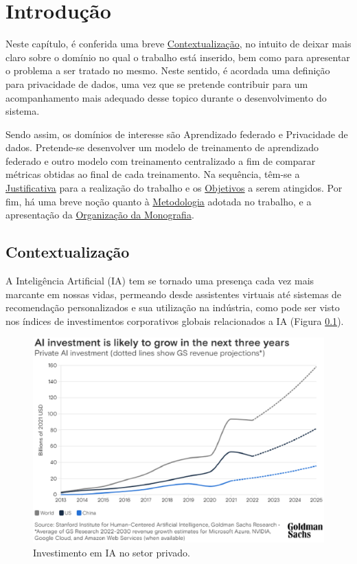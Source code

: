 \chapter*[Introdução]{Introdução}

Neste capítulo, é conferida uma breve \hyperref[sec:contextualizacao]{Contextualização}, no intuito de deixar mais claro sobre o domínio no qual o trabalho está inserido, bem como para apresentar o problema a ser tratado no mesmo. Neste sentido, é acordada uma definição para privacidade de dados, uma vez que se pretende contribuir para um acompanhamento mais adequado desse topico durante o desenvolvimento do sistema. 

Sendo assim, os domínios de interesse são Aprendizado federado e Privacidade de dados. Pretende-se desenvolver um modelo de treinamento de aprendizado federado e outro modelo com treinamento centralizado a fim de comparar métricas obtidas ao final de cada treinamento. Na sequência, têm-se a \hyperref[sec:justificativa]{Justificativa} para a realização do trabalho e os \hyperref[sec:objetivos]{Objetivos} a serem atingidos. Por fim, há uma breve noção quanto à \hyperref[sec:metodologia]{Metodologia} adotada no trabalho, e a apresentação da \hyperref[sec:organizacao]{Organização da Monografia}.

\section{Contextualização}
\label{sec:contextualizacao}

A Inteligência Artificial (IA) tem se tornado uma presença cada vez mais marcante em nossas vidas, permeando desde assistentes virtuais até sistemas de recomendação personalizados e sua utilização na indústria, como pode ser visto nos índices de investimentos corporativos globais relacionados a IA (Figura \ref{fig:investimentoIA}).

\begin{figure}[h]
    \centering
    \includegraphics[scale=0.6]{figuras/introducao/AIInvestiments2025.eps}
    \caption{Investimento em IA no setor privado.}
    \label{fig:investimentoIA}
\end{figure}

